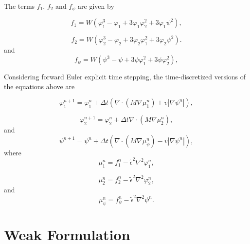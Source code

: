 \documentclass[11pt]{article}
\begin{document}
The terms $f_1$, $f_2$ and $f_\psi$ are given by

\begin{equation} \label{f_1}
f_1=W\left(\varphi_{1}^3-\varphi_{1}+3\varphi_{1}\varphi_{2}^2+3\varphi_{1}\psi^2\right),
\end{equation}

\begin{equation} \label{f_2}
f_2=W\left(\varphi_{2}^3-\varphi_{2}+3\varphi_{2}\varphi_{1}^2+3\varphi_{2}\psi^2\right).
\end{equation}
and
\begin{equation} \label{f_psi}
f_{\psi}= W\left(\psi^3-\psi+3\psi\varphi_{1}^2+3\psi\varphi_{2}^2\right),
\end{equation}

Considering forward Euler explicit time stepping, the time-discretized versions of the equations above are

\begin{equation} \label{phi1_np1}
\varphi^{n+1}_1 = \varphi^n_1+\Delta t \left(\nabla\cdot \left(M\nabla\mu^n_1\right)+v|\nabla \psi^n|\right),
\end{equation}

\begin{equation} \label{phi2_np1}
\varphi^{n+1}_2 = \varphi^n_2+\Delta t \nabla\cdot \left(M\nabla\mu^n_2\right),
\end{equation}
and
\begin{equation} \label{psi_np1}
\psi^{n+1} = \psi^n+\Delta t \left(\nabla\cdot\left(M\nabla\mu^n_{\psi}\right)-v|\nabla\psi^n|\right),
\end{equation}
where
\begin{equation} \label{mu1_n}
\mu^n_1=f^n_1-\widetilde{\epsilon}^2\nabla^2\varphi^n_1,
\end{equation}

\begin{equation} \label{mu2_n}
\mu^n_2=f^n_2-\widetilde{\epsilon}^2\nabla^2\varphi^n_2,
\end{equation}
and
\begin{equation} \label{mu_psi_n}
\mu^n_{\psi}=f^n_{\psi}-\widetilde{\epsilon}^2\nabla^2\psi^n.
\end{equation}


\bigskip
\section{Weak Formulation}
\end{document}
